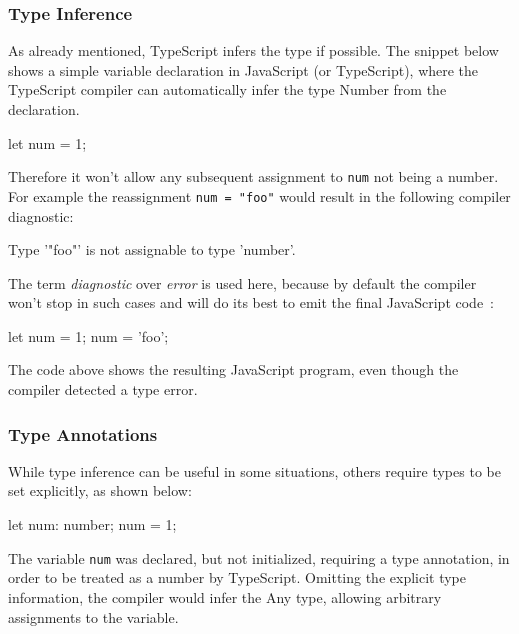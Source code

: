 \subsubsection{Type Inference}
\label{sec:ts-type-inference}

As already mentioned, TypeScript infers the type if possible. The snippet below shows a simple variable declaration in JavaScript (or TypeScript), where the TypeScript compiler can automatically infer the type Number from the declaration.
\begin{JsCode}[numbers=none]
let num = 1;
\end{JsCode}
Therefore it won't allow any subsequent assignment to \texttt{num} not being a number. For example the reassignment \texttt{num = "foo"} would result in the following compiler diagnostic:
\begin{JsCode}[numbers=none]
Type '"foo"' is not assignable to type 'number'.
\end{JsCode}
The term \emph{diagnostic} over \emph{error} is used here, because by default the compiler won't stop in such cases and will do its best to emit the final JavaScript code~\cite[p.~12]{TypeScriptBook:Syed:2017}:
\begin{JsCode}[numbers=none]
let num = 1;
num = 'foo';
\end{JsCode}
The code above shows the resulting JavaScript program, even though the compiler detected a type error.

\subsubsection{Type Annotations}
\label{sec:ts-type-annotations}

While type inference can be useful in some situations, others require types to be set explicitly, as shown below:
\begin{JsCode}[numbers=none]
let num: number;
num = 1;
\end{JsCode}
The variable \texttt{num} was declared, but not initialized, requiring  a type annotation, in order to be treated as a number by TypeScript. Omitting the explicit type information, the compiler would infer the Any type, allowing arbitrary assignments to the variable.

%
%

